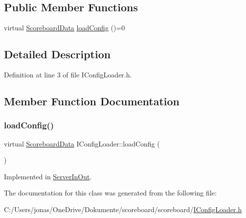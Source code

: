 \subsection*{Public Member Functions}
\begin{DoxyCompactItemize}
\item 
virtual \hyperlink{struct_scoreboard_data}{Scoreboard\+Data} \hyperlink{class_i_config_loader_a951944a5f13c09ce045bca8aa9c6154a}{load\+Config} ()=0
\end{DoxyCompactItemize}


\subsection{Detailed Description}


Definition at line 3 of file I\+Config\+Loader.\+h.



\subsection{Member Function Documentation}
\mbox{\label{class_i_config_loader_a951944a5f13c09ce045bca8aa9c6154a}} 
\subsubsection{\texorpdfstring{load\+Config()}{loadConfig()}}
{\footnotesize\ttfamily virtual \hyperlink{struct_scoreboard_data}{Scoreboard\+Data} I\+Config\+Loader\+::load\+Config (\begin{DoxyParamCaption}{ }\end{DoxyParamCaption})\hspace{0.3cm}{\ttfamily [pure virtual]}}



Implemented in \hyperlink{class_server_in_out_a0525bb536f865858156f5d1527fcaeb6}{Server\+In\+Out}.



The documentation for this class was generated from the following file\+:\begin{DoxyCompactItemize}
\item 
C\+:/\+Users/jonas/\+One\+Drive/\+Dokumente/scoreboard/scoreboard/\hyperlink{_i_config_loader_8h}{I\+Config\+Loader.\+h}\end{DoxyCompactItemize}
